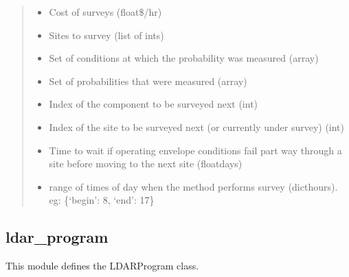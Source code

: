 \documentclass[letterpaper,10pt,english]{sphinxmanual}
\begin{document}
\begin{fulllineitems}
\begin{quote}
\begin{description}
\begin{itemize}
\item {} 
 \textendash{} Cost of surveys (float\textendash{}\$/hr)

\item {} 
 \textendash{} Sites to survey (list of ints)

\item {} 
 \textendash{} Set of conditions at which the probability was measured (array)

\item {} 
 \textendash{} Set of probabilities that were measured (array)

\item {} 
 \textendash{} Index of the component to be surveyed next (int)

\item {} 
 \textendash{} Index of the site to be surveyed next (or currently under survey) (int)

\item {} 
 \textendash{} Time to wait if operating envelope conditions fail part way through a site before
moving to the next site (float\textendash{}days)

\item {} 
 \textendash{} range of times of day when the method performs survey (dict\textendash{}hours). eg: \{‘begin’: 8, ‘end’: 17\}

\end{itemize}

\end{description}\end{quote}

\end{fulllineitems}



\subsection{ldar\_program}
\label{\detokenize{index:module-feast.DetectionModules.ldar_program}}\label{\detokenize{index:ldar-program}}
This module defines the LDARProgram class.
\end{document}
